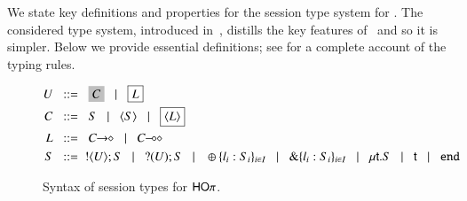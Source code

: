 \documentclass[preprint,11pt]{elsarticle}
\begin{document}
We state key definitions and properties for the session type system for \HOp.
The considered type system,
introduced in~\cite{KouzapasPY17},
 distills the key features of~\cite{tlca07,MostrousY15} and so it is simpler.
 Below we provide essential definitions; see  
for a complete account of the typing rules.




\begin{figure}[t!]
	\begin{align*}
		U & \bnfis 	\nonhosyntax{C} \bnfbar \nonpisyntax{L}
		\\
		C  & \bnfis		S \bnfbar \chtype{S} \bnfbar \nonpisyntax{\chtype{L}}
\\		
L & \bnfis		\shot{C} \bnfbar \lhot{C}
		\\ 
		S & \bnfis 	\btout{U} S \bnfbar \btinp{U} S \bnfbar \btsel{l_i:S_i}_{i \in I}
						\bnfbar \btbra{l_i:S_i}_{i \in I} \bnfbar  \trec{t}{S} \bnfbar \vart{t}  \bnfbar \tinact
	\end{align*}
	\caption{Syntax of session types for $\mathsf{HO}\pi$.\label{f:types}}
\end{figure}
\end{document}

